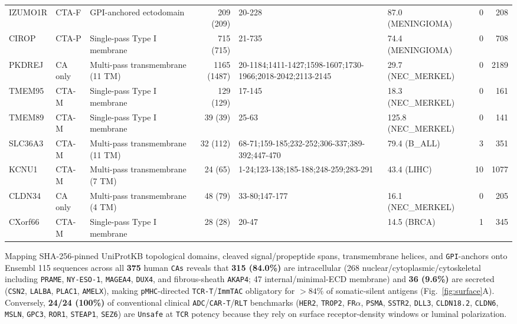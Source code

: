 \documentclass[10pt,letterpaper]{article}
\begin{document}
\begin{table}[htbp]
\begin{tabularx}{\textwidth}{l l p{3.1cm} r p{2.3cm} p{2.3cm} r r}
IZUMO1R & CTA-F & GPI-anchored ectodomain & 209 (209) & 20-228 & 87.0 (MENINGIOMA) & 0 & 208 \\
CIROP & CTA-P & Single-pass Type I membrane & 715 (715) & 21-735 & 74.4 (MENINGIOMA) & 0 & 708 \\
PKDREJ & CA only & Multi-pass transmembrane (11 TM) & 1165 (1487) & 20-1184;1411-1427;1598-1607;1730-1966;2018-2042;2113-2145 & 29.7 (NEC\_MERKEL) & 0 & 2189 \\
TMEM95 & CTA-M & Single-pass Type I membrane & 129 (129) & 17-145 & 18.3 (NEC\_MERKEL) & 0 & 161 \\
TMEM89 & CTA-M & Single-pass Type I membrane & 39 (39) & 25-63 & 125.8 (NEC\_MERKEL) & 0 & 141 \\
SLC36A3 & CTA-M & Multi-pass transmembrane (11 TM) & 32 (112) & 68-71;159-185;232-252;306-337;389-392;447-470 & 79.4 (B\_ALL) & 3 & 351 \\
KCNU1 & CTA-M & Multi-pass transmembrane (7 TM) & 24 (65) & 1-24;123-138;185-188;248-259;283-291 & 43.4 (LIHC) & 10 & 1077 \\
CLDN34 & CA only & Multi-pass transmembrane (4 TM) & 48 (79) & 33-80;147-177 & 16.1 (NEC\_MERKEL) & 0 & 205 \\
CXorf66 & CTA-M & Single-pass Type I membrane & 28 (28) & 20-47 & 14.5 (BRCA) & 1 & 345 \\
\bottomrule
\end{tabularx}
\end{table}
Mapping SHA-256-pinned UniProtKB topological domains, cleaved signal/propeptide spans, transmembrane helices, and \texttt{GPI}-anchors onto Ensembl 115 sequences across all \textbf{375} human \texttt{CAs} reveals that \textbf{315 (84.0\%)} are intracellular (268 nuclear/cytoplasmic/cytoskeletal including \texttt{PRAME}, \texttt{NY-ESO-1}, \texttt{MAGEA4}, \texttt{DUX4}, and fibrous-sheath \texttt{AKAP4}; 47 internal/minimal-ECD membrane) and \textbf{36 (9.6\%)} are secreted (\texttt{CSN2}, \texttt{LALBA}, \texttt{PLAC1}, \texttt{AMELX}), making \texttt{pMHC}-directed \texttt{TCR-T}/\texttt{ImmTAC} obligatory for $>84\%$ of somatic-silent antigens (Fig.~\ref{fig:surface}A). Conversely, \textbf{24/24 (100\%)} of conventional clinical \texttt{ADC}/\texttt{CAR-T}/\texttt{RLT} benchmarks (\texttt{HER2}, \texttt{TROP2}, \texttt{FR$\alpha$}, \texttt{PSMA}, \texttt{SSTR2}, \texttt{DLL3}, \texttt{CLDN18.2}, \texttt{CLDN6}, \texttt{MSLN}, \texttt{GPC3}, \texttt{ROR1}, \texttt{STEAP1}, \texttt{SEZ6}) are \texttt{Unsafe} at \texttt{TCR} potency because they rely on surface receptor-density windows or luminal polarization.
\end{document}
